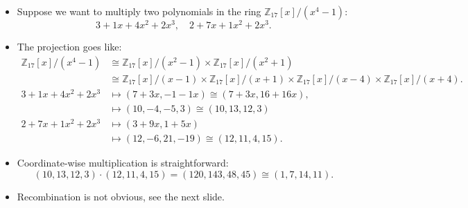 \begin{frame}
    \begin{itemize}
        \item <4->Suppose we want to multiply two polynomials in the ring \( \mathbb{Z}_{17}[x]/(x^{4}-1) \):
            \[
                3 + 1x + 4x^{2} + 2x^{3},\quad 2 + 7x + 1x^{2} + 2x^{3}.
            \]
        \item The projection goes like:
            \begin{align*}
                \mathbb{Z}_{17}[x]/(x^{4}-1) 
                &\cong 
                \mathbb{Z}_{17}[x]/(x^{2}-1) \times 
                \mathbb{Z}_{17}[x]/(x^{2}+1)\\
                &\cong 
                \mathbb{Z}_{17}[x]/(x-1) \times 
                \mathbb{Z}_{17}[x]/(x+1) \times 
                \mathbb{Z}_{17}[x]/(x-4) \times 
                \mathbb{Z}_{17}[x]/(x+4).\\
                3 + 1x + 4x^{2} + 2x^{3} 
                &\mapsto 
                (7 + 3x, -1 - 1x) \cong (7 + 3x, 16 + 16x),\\
                &\mapsto 
                (10, -4, -5, 3 ) \cong (10, 13, 12, 3)\\
                2 + 7x + 1x^{2} + 2x^{3} 
                &\mapsto 
                (3 + 9x, 1 + 5x)\\
                &\mapsto 
                (12, -6, 21, -19 ) \cong (12, 11, 4, 15).
            \end{align*}
        \item <5->Coordinate-wise multiplication is straightforward:
            \[
                (10, 13, 12, 3) \cdot (12, 11, 4, 15) = (120, 143, 48, 45)
                \cong (1, 7, 14, 11).
            \]
        \item <6->Recombination is not obvious, see the next slide.
    \end{itemize}
\end{frame}


